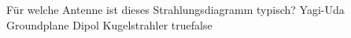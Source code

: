     {Für welche Antenne ist dieses Strahlungsdiagramm typisch?}
    {Yagi-Uda}
    {Groundplane}
    {Dipol}
    {Kugelstrahler}
    {true}{false}